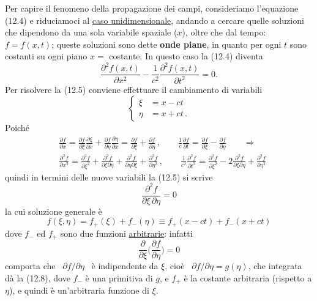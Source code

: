 Per capire il fenomeno della propagazione dei campi, consideriamo l'equazione
(12.4) e riduciamoci al \underline{caso unidimensionale}, andando a cercare
quelle soluzioni che dipendono da una sola variabile spaziale ($x$), oltre che
dal tempo: \ $f=f(x,t)$; queste soluzioni sono dette \textbf{onde piane}, in
quanto per ogni $t$ sono costanti su ogni piano $x=$ costante. In questo caso la
(12.4) diventa
\begin{equation}
  \frac{\partial^2f(x,t)}{\partial x^2}
  -\frac{1}{c^2}\frac{\partial^2f(x,t)}{\partial t^2}=0.
  \tag{12.5}
\end{equation}
Per risolvere la (12.5) conviene effettuare il cambiamento di variabili
\begin{equation}
  \left\{\begin{aligned}
    \xi&=x-ct\\
    \eta&=x+ct\,.
  \end{aligned}\right.
  \tag{12.6}
\end{equation}
Poich\'e
\[
  \begin{aligned}
    &\frac{\partial f}{\partial x}
    =\frac{\partial f}{\partial\xi}\frac{\partial\xi}{\partial x}
    +\frac{\partial f}{\partial\eta}\frac{\partial\eta}{\partial x}
    =\frac{\partial f}{\partial\xi}+\frac{\partial f}{\partial\eta}\,,
    \qquad\frac{1}{c}\frac{\partial f}{\partial t}
    =\frac{\partial f}{\partial\xi}-\frac{\partial f}{\partial\eta}
    \qquad\Rightarrow\\
    &\frac{\partial^2f}{\partial x^2}=\frac{\partial^2f}{\partial\xi^2}
    +\frac{\partial^2f}{\partial\xi\partial\eta}
    +\frac{\partial^2f}{\partial\eta\partial\xi}
    +\frac{\partial^2f}{\partial\eta^2}\,,
    \qquad\frac{1}{c^2}\frac{\partial^2f}{\partial t^2}
    =\frac{\partial^2f}{\partial\xi^2}
    -2\frac{\partial^2f}{\partial\xi\partial\eta}
    +\frac{\partial^2f}{\partial\eta^2}
  \end{aligned}
\]
quindi in termini delle nuove variabili la (12.5) si scrive
\begin{equation}
  \frac{\partial^2f}{\partial\xi\,\partial\eta}=0
  \tag{12.7}
\end{equation}
la cui soluzione generale \`e
\begin{equation}
  f(\xi,\eta)=f_+(\xi)+f_-(\eta)\equiv f_+(x-ct)+f_-(x+ct)
  \tag{12.8}
\end{equation}
dove $f_-$ ed $f_+$ sono due funzioni \underline{arbitrarie}: infatti
\begin{equation}
  \frac{\partial}{\partial\xi}\Big(\frac{\partial f}{\partial\eta}\Big)=0
  \tag{12.9}
\end{equation}
comporta che \ $\partial f/\partial\eta$ \ \`e indipendente da $\xi$, cio\`e
\ $\partial f/\partial\eta=g(\eta)$, che integrata d\`a la (12.8), dove $f_-$
\`e una primitiva di $g$, e $f_+$ \`e la costante arbitraria (rispetto a
$\eta$), e quindi \`e un'arbitraria funzione di $\xi$.

